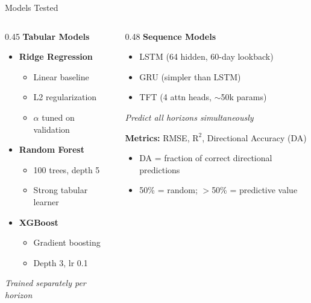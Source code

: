 \documentclass[aspectratio=169,xcolor={dvipsnames}]{beamer}
\newcommand{\rTwo}{\ensuremath{\mathrm{R}^2}}
\begin{document}
\begin{frame}{Models Tested}
  \small
  \begin{columns}[T]
    \begin{column}{0.45\textwidth}
      \textbf{Tabular Models}
      \begin{itemize}\scriptsize
        \item \textbf{Ridge Regression}
        \begin{itemize}
          \item Linear baseline
          \item L2 regularization
          \item $\alpha$ tuned on validation
        \end{itemize}
        
        \item \textbf{Random Forest}
        \begin{itemize}
          \item 100 trees, depth 5
          \item Strong tabular learner
        \end{itemize}
        
        \item \textbf{XGBoost}
        \begin{itemize}
          \item Gradient boosting
          \item Depth 3, lr 0.1
        \end{itemize}
      \end{itemize}
      
      \vspace{0.2cm}
      \scriptsize
      \textit{Trained separately per horizon}
    \end{column}
    
    \begin{column}{0.48\textwidth}
      \textbf{Sequence Models}
      \begin{itemize}
        \item LSTM (64 hidden, 60-day lookback)
        \item GRU (simpler than LSTM)
        \item TFT (4 attn heads, $\sim$50k params)
      \end{itemize}
      
      \vspace{0.3cm}
      \scriptsize
      \textit{Predict all horizons simultaneously}
      
      \textbf{Metrics:} RMSE, $\rTwo$, Directional Accuracy (DA)
      \begin{itemize}
        \item DA = fraction of correct directional predictions
        \item 50\% = random; $>$50\% = predictive value
      \end{itemize}
    \end{column}
  \end{columns}
  
\end{frame}
\end{document}
